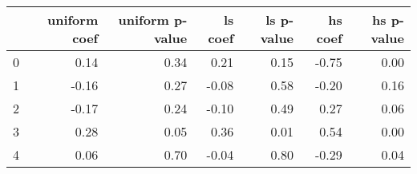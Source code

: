 \begin{tabular}{lrrrrrr}
\toprule
 & uniform coef & uniform p-value & ls coef & ls p-value & hs coef & hs p-value \\
\midrule
0 & 0.14 & 0.34 & 0.21 & 0.15 & -0.75 & 0.00 \\
1 & -0.16 & 0.27 & -0.08 & 0.58 & -0.20 & 0.16 \\
2 & -0.17 & 0.24 & -0.10 & 0.49 & 0.27 & 0.06 \\
3 & 0.28 & 0.05 & 0.36 & 0.01 & 0.54 & 0.00 \\
4 & 0.06 & 0.70 & -0.04 & 0.80 & -0.29 & 0.04 \\
\bottomrule
\end{tabular}
